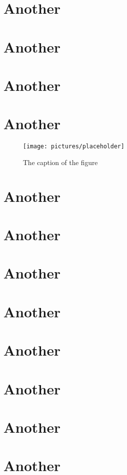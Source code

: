 \documentclass[12pt, oneside]{report}
\providecommand{\main}{.}
\begin{document}
\chapter{Another}
\chapter{Another}
\chapter{Another}
\chapter{Another}
\begin{figure}[h]
  \centering
  \texttt{[image: pictures/placeholder]}
  \caption{The caption of the figure}
  \label{fig:BlockDiagram4}
\end{figure}
\chapter{Another}
\chapter{Another}
\chapter{Another}
\chapter{Another}
\chapter{Another}
\chapter{Another}
\chapter{Another}
\chapter{Another}



\backmatter



\end{document}
